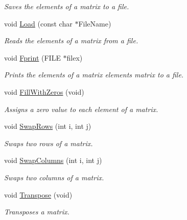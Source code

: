 \begin{DoxyCompactItemize}
\begin{DoxyCompactList}\small\item\em Saves the elements of a matrix to a file. \item\end{DoxyCompactList}\item 
void \hyperlink{classDMatrix_a26e8a17738092057014b0b72ef99c661}{Load} (const char $\ast$FileName)
\begin{DoxyCompactList}\small\item\em Reads the elements of a matrix from a file. \item\end{DoxyCompactList}\item 
void \hyperlink{classDMatrix_a3470a954caccffa3bec8b134c2e5f179}{Fprint} (FILE $\ast$filex)
\begin{DoxyCompactList}\small\item\em Prints the elements of a matrix elements matrix to a file. \item\end{DoxyCompactList}\item 
void \hyperlink{classDMatrix_abebb69fbb1f71d2b49f575153bb36fee}{FillWithZeros} (void)
\begin{DoxyCompactList}\small\item\em Assigns a zero value to each element of a matrix. \item\end{DoxyCompactList}\item 
void \hyperlink{classDMatrix_a78d654687b6b56497279a81bdc28d4f7}{SwapRows} (int i, int j)
\begin{DoxyCompactList}\small\item\em Swaps two rows of a matrix. \item\end{DoxyCompactList}\item 
void \hyperlink{classDMatrix_a3b9322caa649274e47049960b1f60a33}{SwapColumns} (int i, int j)
\begin{DoxyCompactList}\small\item\em Swaps two columns of a matrix. \item\end{DoxyCompactList}\item 
void \hyperlink{classDMatrix_a23e7c1ac8350421a1798a59363452f79}{Transpose} (void)
\begin{DoxyCompactList}\small\item\em Transposes a matrix. \item\end{DoxyCompactList}\item 

\end{DoxyCompactItemize}
